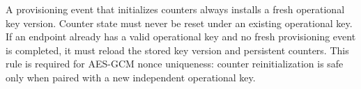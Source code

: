 \documentclass[journal]{IEEEtran}
\begin{document}



A provisioning event that initializes counters always installs a fresh operational key version. Counter state must never be reset under an existing operational key. If an endpoint already has a valid operational key and no fresh provisioning event is completed, it must reload the stored key version and persistent counters. This rule is required for AES-GCM nonce uniqueness: counter reinitialization is safe only when paired with a new independent operational key.
\end{document}
